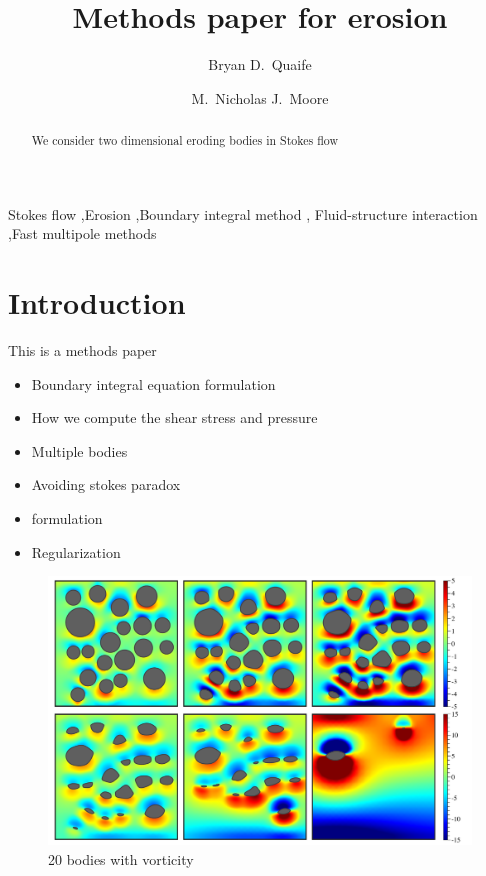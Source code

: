 \documentclass[preprint, 10pt]{elsarticle}
\begin{document}
\title{Methods paper for erosion}

\author[Bryan]{Bryan D.~Quaife}
\author[Nick]{M.~Nicholas J.~Moore}
\address[Nick]{Department of Mathematics and Geophysical Fluid Dynamics Institute, Florida State University, Tallahassee, FL, 32306.}
\address[Bryan]{Department of Scientific Computing and Geophysical Fluid Dynamics Institute, Florida State University, Tallahassee, FL, 32306.}

\begin{abstract} 
We consider two dimensional eroding bodies in Stokes flow
\end{abstract}

\begin{keyword}
  Stokes flow \sep Erosion \sep Boundary integral method \sep
  Fluid-structure interaction \sep Fast multipole methods 
\end{keyword}

\maketitle

\section{Introduction\label{s:intro}}

This is a methods paper
\begin{itemize}
  \item Boundary integral equation formulation
  \item How we compute the shear stress and pressure
  \item Multiple bodies
  \item Avoiding stokes paradox
  \item {\thL} formulation
  \item Regularization
\end{itemize}


\begin{figure}%
\begin{center}
\includegraphics[width = 0.9 \textwidth]{./figs/20bod.pdf}
\caption{20 bodies with vorticity}
\label{}
\end{center}
\end{figure}
\end{document}
